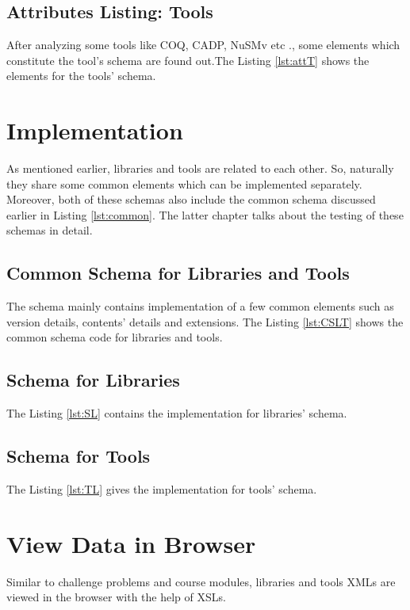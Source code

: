 \documentclass[11pt,letterpaper]{report}
\begin{document}
\subsection{Attributes Listing: Tools}
After analyzing some tools like COQ, CADP, NuSMv etc \cite{COQ,CADP}., some elements which constitute the tool's schema are found out.The Listing \ref{lst:attT} shows the elements for the tools' schema. 

  
\section{Implementation}
As mentioned earlier, libraries and tools are related to each other. So, naturally they share some common elements which can be implemented separately. Moreover, both of these schemas also include the common schema discussed earlier in Listing \ref{lst:common}. The latter chapter talks about the testing of these schemas in detail. 
\subsection{Common Schema for Libraries and Tools}
The schema mainly contains implementation of a few common elements such as version details, contents' details and extensions. The Listing \ref{lst:CSLT} shows the common schema code for libraries and tools.
  
\subsection{Schema for Libraries}
The Listing \ref{lst:SL} contains the implementation for libraries' schema. 

\subsection{Schema for Tools}
The Listing \ref{lst:TL} gives the implementation for tools' schema. 


\section{View Data in Browser}
Similar to challenge problems and course modules, libraries and tools XMLs are viewed in the browser with the help of XSLs. 
\end{document}
